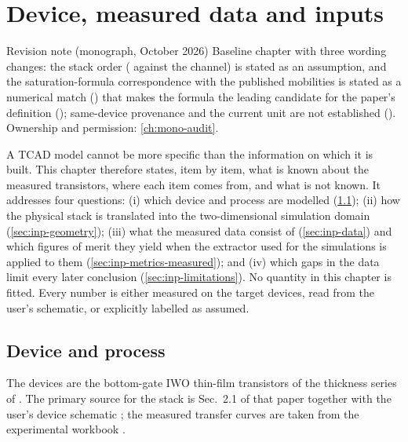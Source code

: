 \chapter{Device, measured data and inputs}\label{ch:device}

\begin{statusbox}{Revision note (monograph, October 2026)}
Baseline chapter with three wording changes: the stack order (\AlO{} against the channel) is stated as an
assumption, and the saturation-formula correspondence with the published mobilities is stated as a numerical
match () that makes the formula the leading candidate for the paper's definition ();
same-device provenance and the current unit are not established (). Ownership and permission:
\cref{ch:mono-audit}.
\end{statusbox}

A TCAD model cannot be more specific than the information on which it is built. This chapter therefore states, item by
item, what is known about the measured transistors, where each item comes from, and what is not known. It addresses four
questions: (i) which device and process are modelled (\cref{sec:inp-device}); (ii) how the physical stack is translated
into the two-dimensional simulation domain (\cref{sec:inp-geometry}); (iii) what the measured data consist of
(\cref{sec:inp-data}) and which figures of merit they yield when the extractor used for the simulations is applied to
them (\cref{sec:inp-metrics-measured}); and (iv) which gaps in the data limit every later conclusion
(\cref{sec:inp-limitations}). No quantity in this chapter is fitted. Every number is either measured on the target
devices, read from the user's schematic, or explicitly labelled as assumed.

\section{Device and process}\label{sec:inp-device}

The devices are the bottom-gate IWO thin-film transistors of the thickness series of \citet{Januar2026}. The primary
source for the stack is Sec.~2.1 of that paper \citep[pp.~2--3]{Januar2026} together with the user's device schematic
\citep{DeviceSchematic}; the measured transfer curves are taken from the experimental workbook
\citep{ExperimentalWorkbook}.

